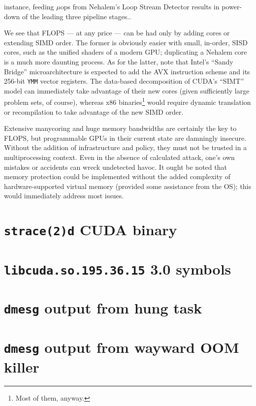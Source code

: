 \documentclass[letterpaper,10pt]{article}
\begin{document}
\begin{multicols}{2}
\begin{itemize}
{instance, feeding $\mu$ops from Nehalem's Loop Stream Detector results in power-down
of the leading three pipeline stages.}.
\end{itemize}
We see that FLOPS --- at any price --- can be had only by adding cores or extending
SIMD order. The former is obviously easier with small, in-order, SISD cores,
such as the unified shaders of a modern GPU\@; duplicating a Nehalem core is a
much more daunting process. As for the latter, note that Intel's ``Sandy
Bridge'' microarchitecture is expected to add the AVX instruction scheme and
its 256-bit \texttt{YMM} vector registers\cite{avx}\cite{fma4}. The data-based decomposition of CUDA's
``SIMT'' model can immediately take advantage of their new cores (given
sufficiently large problem sets, of course), whereas x86 binaries\footnote{Most of them, anyway.} would
require dynamic translation or recompilation to take advantage of the new SIMD
order.

Extensive manycoring and huge memory bandwidths are certainly the key to FLOPS,
but programmable GPUs in their current state are damningly insecure. Without the
addition of infrastructure and policy, they must not be trusted in a
multiprocessing context. Even in the absence of calculated attack, one's own
mistakes or accidents can wreck undetected havoc. It ought be noted that memory
protection could be implemented without the added complexity of
hardware-supported virtual memory (provided some assistance from the OS); this
would immediately address most issues.



\end{multicols}
\appendix
\newpage
\section{\texttt{strace(2)d} CUDA binary}\label{strace}
\newpage
\section{\texttt{libcuda.so.195.36.15} 3.0 symbols}\label{strace}
\section{\texttt{dmesg} output from hung task}\label{oops}
\section{\texttt{dmesg} output from wayward OOM killer}\label{oops}
\end{document}
